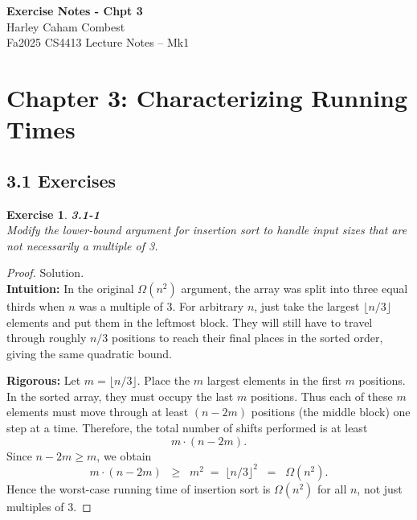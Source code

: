 \documentclass[12pt]{article}
\newtheorem{exercise}[theorem]{Exercise}
\theoremstyle{definition}
\begin{document}
\begin{center}
\Large\textbf{Exercise Notes - Chpt 3} \\
\large Harley Caham Combest \\
\large Fa2025 CS4413 Lecture Notes – Mk1
\end{center}

\vspace{1em}

\dotfill
\section*{Chapter 3: Characterizing Running Times}
\dotfill

\vspace{1em}

\subsection*{3.1 Exercises}

\begin{exercise}
\noindent
\textbf{3.1-1} \\
Modify the lower-bound argument for insertion sort to handle input sizes
that are not necessarily a multiple of 3.
\end{exercise}

\begin{proof}
Solution. \\

\noindent
\textbf{Intuition:}  
In the original $\Omega(n^2)$ argument, the array was split into three equal
thirds when $n$ was a multiple of 3. For arbitrary $n$, just take the
largest $\lfloor n/3 \rfloor$ elements and put them in the leftmost block.
They will still have to travel through roughly $n/3$ positions to reach
their final places in the sorted order, giving the same quadratic bound.

\noindent
\textbf{Rigorous:}  
Let $m = \lfloor n/3 \rfloor$. Place the $m$ largest elements in the first $m$
positions. In the sorted array, they must occupy the last $m$ positions.
Thus each of these $m$ elements must move through at least
$(n - 2m)$ positions (the middle block) one step at a time.
Therefore, the total number of shifts performed is at least
\[
m \cdot (n - 2m).
\]
Since $n - 2m \ge m$, we obtain
\[
m \cdot (n - 2m) \;\;\ge\;\; m^2 \;=\; \lfloor n/3 \rfloor^2 \;\;=\;\; \Omega(n^2).
\]
Hence the worst-case running time of insertion sort is $\Omega(n^2)$
for all $n$, not just multiples of 3.
\end{proof}
\end{document}
